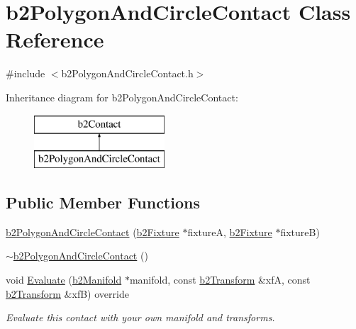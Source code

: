 \hypertarget{classb2_polygon_and_circle_contact}{}\section{b2\+Polygon\+And\+Circle\+Contact Class Reference}
\label{classb2_polygon_and_circle_contact}


{\ttfamily \#include $<$b2\+Polygon\+And\+Circle\+Contact.\+h$>$}

Inheritance diagram for b2\+Polygon\+And\+Circle\+Contact\+:\begin{figure}[H]
\begin{center}
\leavevmode
\includegraphics[height=2.000000cm]{classb2_polygon_and_circle_contact}
\end{center}
\end{figure}
\subsection*{Public Member Functions}
\begin{DoxyCompactItemize}
\item 
\mbox{\hyperlink{classb2_polygon_and_circle_contact_a38158da229eee22253c1f64df1982e40}{b2\+Polygon\+And\+Circle\+Contact}} (\mbox{\hyperlink{classb2_fixture}{b2\+Fixture}} $\ast$fixtureA, \mbox{\hyperlink{classb2_fixture}{b2\+Fixture}} $\ast$fixtureB)
\item 
\mbox{\hyperlink{classb2_polygon_and_circle_contact_abe6539183d4904194418809915b20490}{$\sim$b2\+Polygon\+And\+Circle\+Contact}} ()
\item 
void \mbox{\hyperlink{classb2_polygon_and_circle_contact_a4af8338f124be0b7ec704997be4736b1}{Evaluate}} (\mbox{\hyperlink{structb2_manifold}{b2\+Manifold}} $\ast$manifold, const \mbox{\hyperlink{structb2_transform}{b2\+Transform}} \&xfA, const \mbox{\hyperlink{structb2_transform}{b2\+Transform}} \&xfB) override
\begin{DoxyCompactList}\small\item\em Evaluate this contact with your own manifold and transforms. \end{DoxyCompactList}\end{DoxyCompactItemize}
